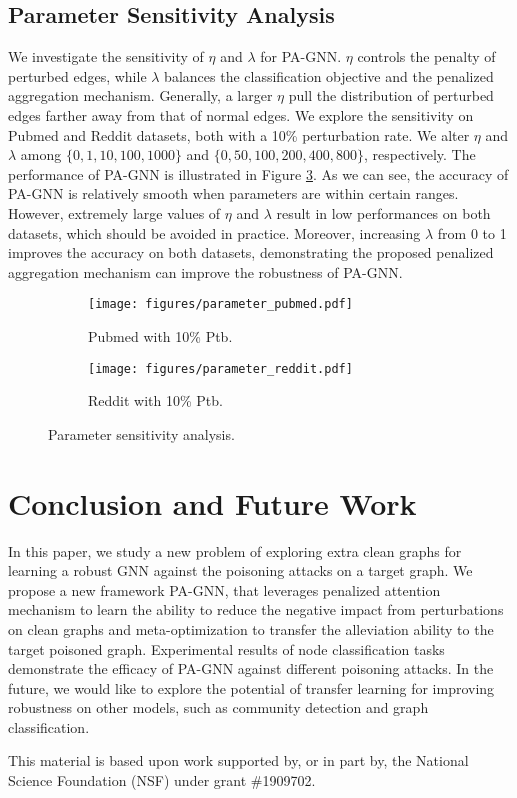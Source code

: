 \documentclass[sigconf]{acmart}
\newcommand{\our}{{PA-GNN}\xspace}
\newcommand{\ours}{{PA-GNN}\xspace}
\begin{document}
\subsection{Parameter Sensitivity Analysis} \label{sec:parameter_sensitivity}
We investigate the sensitivity of $\eta$ and $\lambda$ for \ours. $\eta$ controls the penalty of perturbed edges, while $\lambda$ balances the classification objective and the penalized aggregation mechanism.
Generally, a larger $\eta$ pull the distribution of perturbed edges farther away from that of normal edges.
We explore the sensitivity on Pubmed and Reddit datasets, both with a 10\% perturbation rate. We alter $\eta$ and $\lambda$ among $\{0, 1, 10, 100, 1000\}$ and $\{0, 50, 100, 200, 400, 800\}$, respectively. The performance of \ours is illustrated in Figure \ref{fig:para}. As we can see, the accuracy of \ours is relatively smooth when parameters are within certain ranges. However, extremely large values of $\eta$ and $\lambda$ result in low performances on both datasets, which should be avoided in practice. Moreover, increasing $\lambda$ from 0 to 1 improves the accuracy on both datasets, demonstrating the proposed penalized aggregation mechanism can improve the robustness of \ours.

\begin{figure}[h]
    \centering
\begin{subfigure}{.2\textwidth}
      \centering
      \texttt{[image: figures/parameter\_pubmed.pdf]}
\caption{Pubmed with 10\% Ptb.}
      \label{fig:para_pubmed}
    \end{subfigure} \quad
    \begin{subfigure}{.2\textwidth}
      \centering
      \texttt{[image: figures/parameter\_reddit.pdf]}
\caption{Reddit with 10\% Ptb.}
      \label{fig:para_reddit}
    \end{subfigure}
\caption{Parameter sensitivity analysis.}
    \label{fig:para}
\end{figure}



 \section{Conclusion and Future Work}
In this paper, we study a new problem of exploring extra clean graphs for learning a robust GNN against the poisoning attacks on a target graph. We propose a new framework \our, that leverages penalized attention mechanism to learn the ability to reduce the negative impact from perturbations on clean graphs and meta-optimization to transfer the alleviation ability to the target poisoned graph. Experimental results of node classification tasks demonstrate the efficacy of \ours against different poisoning attacks. In the future, we would like to explore the potential of transfer learning for improving robustness on other models, such as community detection and graph classification.
 
\begin{acks}
This material is based upon work supported by, or in part by, the National Science Foundation (NSF) under grant \#1909702.
\end{acks}




\end{document}
